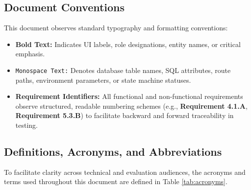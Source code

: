 \documentclass[12pt, a4paper]{article}
\begin{document}
\subsection{Document Conventions}
This document observes standard typography and formatting conventions:
\begin{itemize}[leftmargin=*]
    \item \textbf{Bold Text:} Indicates UI labels, role designations, entity names, or critical emphasis.
    \item \texttt{Monospace Text:} Denotes database table names, SQL attributes, route paths, environment parameters, or state machine statuses.
    \item \textbf{Requirement Identifiers:} All functional and non-functional requirements observe structured, readable numbering schemes (e.g., \textbf{Requirement 4.1.A}, \textbf{Requirement 5.3.B}) to facilitate backward and forward traceability in testing.
\end{itemize}

\subsection{Definitions, Acronyms, and Abbreviations}
To facilitate clarity across technical and evaluation audiences, the acronyms and terms used throughout this document are defined in Table \ref{tab:acronyms}.
\end{document}

